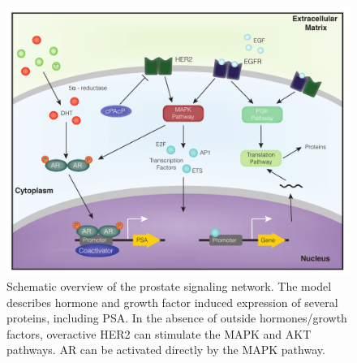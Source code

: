 \documentclass[12pt]{article}
\begin{document}
\clearpage
%
%




\clearpage

\begin{figure}\centering
\includegraphics[width=1.0\textwidth]{./figs/Fig_1_LNCAPModel.pdf}
\caption{Schematic overview of the prostate signaling network. The model describes hormone and growth factor induced expression of several proteins, including PSA. In the absence of outside hormones/growth factors, overactive HER2 can stimulate the MAPK and AKT pathways. AR can be activated directly by the MAPK pathway.
}
\label{fg:NetworkSchematic}
\end{figure}

\clearpage
\end{document}
